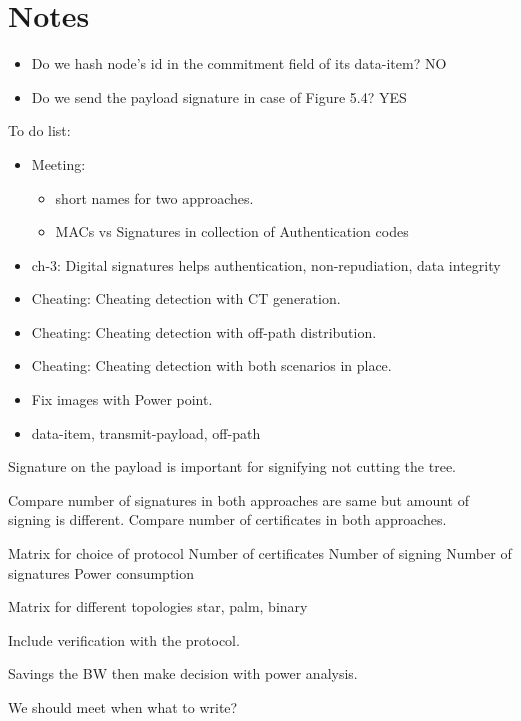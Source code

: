 \chapter{Notes}

\begin{itemize}
	\item Do we hash node's id in the commitment field of its data-item? NO
	\item Do we send the payload signature in case of Figure 5.4? YES
\end{itemize}

To do list:
\begin{itemize}
	\item Meeting: 
	\begin{itemize}
	\item short names for two approaches.
	\item MACs vs Signatures in collection of Authentication codes
	\end{itemize}
	\item ch-3: Digital signatures helps authentication, non-repudiation, data integrity
	\item Cheating: Cheating detection with CT generation.
	\item Cheating: Cheating detection with off-path distribution.
	\item Cheating: Cheating detection with both scenarios in place.
	\item Fix images with Power point.
	\item data-item, transmit-payload, off-path

\end{itemize}
	
	Signature on the payload is important for signifying not cutting the tree.

	Compare number of signatures in both approaches are same but amount of signing is different.
	Compare number of certificates in both approaches.

	Matrix for choice of protocol
		Number of certificates
		Number of signing
		Number of signatures
		Power consumption

	Matrix for different topologies
		star, palm, binary 
		
	Include verification with the protocol.

	Savings the BW then make decision with power analysis.

We should meet when what to write?